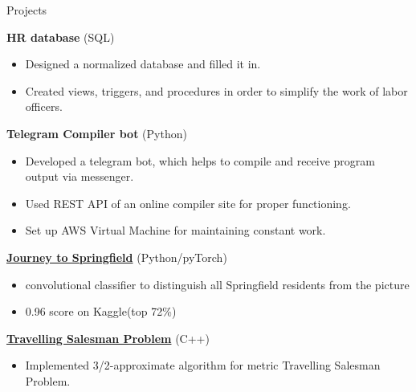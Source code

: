 \documentclass{resume} %
\begin{document}
\begin{rSection}{Projects}
\begin{multicols}{2}
{\bf HR database} (SQL) 
\vspace{-2mm}
\begin{itemize}[noitemsep, parsep=0pt, leftmargin=*]
    \item Designed a normalized database and filled it in.
    \item Created views, triggers, and procedures in order to simplify the work of labor officers.
\end{itemize}

{\bf Telegram Compiler bot} (Python)
\renewcommand\labelitemi{\tiny$\bullet$}
\vspace{-2mm}
\begin{itemize}[noitemsep, parsep=0pt, leftmargin=*]
    \item Developed a telegram bot, which helps to compile and receive program output via messenger.
    \item Used REST API of an online compiler site  for proper functioning.
    \item Set up AWS Virtual Machine for maintaining constant work.
\end{itemize}

{\bf \textcolor{blue}{\href{https://github.com/sungulnara2000/Journey-To-Springfiled/blob/master/Journey_to_Springfield.ipynb}{Journey to Springfield}}} (Python/pyTorch)
\renewcommand\labelitemi{\tiny$\bullet$}
\vspace{-2mm}
\begin{itemize}[noitemsep, parsep=0pt, leftmargin=*]
    \item convolutional classifier to distinguish all Springfield residents from the picture
    \item 0.96 score on Kaggle(top 72\%)
\end{itemize}


{\bf \textcolor{blue}{\href{https://github.com/sungulnara2000/TravellingSalesmanProblem/tree/master/salesman_travis}{Travelling Salesman Problem}}} (C++)
\vspace{-2mm}
\begin{itemize}[noitemsep, parsep=0pt, leftmargin=*]
    \item Implemented 3/2-approximate algorithm for metric Travelling Salesman Problem.
\end{itemize}


\end{multicols}
\end{rSection}
\end{document}
